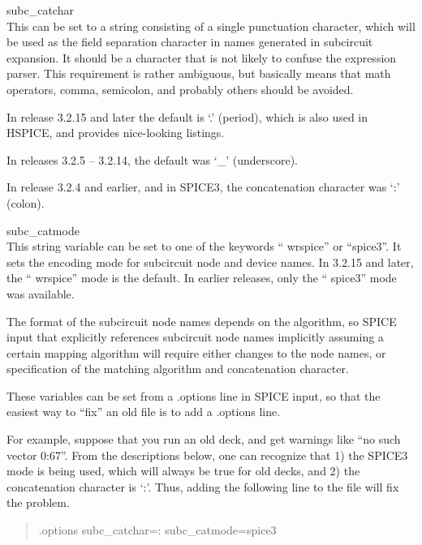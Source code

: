 \begin{description}
\item{\et subc\_catchar}\\
This can be set to a string consisting of a single punctuation
character, which will be used as the field separation character in
names generated in subcircuit expansion.  It should be a character
that is not likely to confuse the expression parser.  This requirement
is rather ambiguous, but basically means that math operators, comma,
semicolon, and probably others should be avoided.

In release 3.2.15 and later the default is `{\vt .}' (period), which
is also used in HSPICE, and provides nice-looking listings.

In releases 3.2.5 -- 3.2.14, the default was `{\vt \_}' (underscore).

In release 3.2.4 and earlier, and in SPICE3, the concatenation
character was `{\vt :}' (colon).

\item{\et subc\_catmode}\\
This string variable can be set to one of the keywords ``{\vt
wrspice}'' or ``{\vt spice3}''.  It sets the encoding mode for
subcircuit node and device names.  In 3.2.15 and later, the ``{\vt
wrspice}'' mode is the default.  In earlier releases, only the ``{\vt
spice3}'' mode was available.
\end{description}

The format of the subcircuit node names depends on the algorithm, so
SPICE input that explicitly references subcircuit node names
implicitly assuming a certain mapping algorithm will require either
changes to the node names, or specification of the matching algorithm
and concatenation character.

These variables can be set from a {\vt .options} line in SPICE input,
so that the easiest way to ``fix'' an old file is to add a {\vt
.options} line.

For example, suppose that you run an old deck, and get warnings like
``{\vt no such vector 0:67}''.  From the descriptions below, one can
recognize that 1) the SPICE3 mode is being used, which will always be
true for old decks, and 2) the concatenation character is `{\vt :}'. 
Thus, adding the following line to the file will fix the problem.

\begin{quote}\vt
.options subc\_catchar=: subc\_catmode=spice3
\end{quote}

